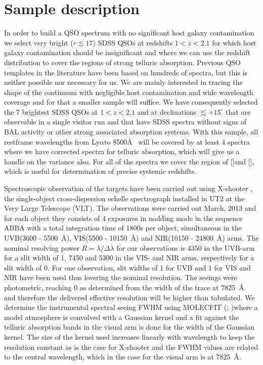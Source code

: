 \documentclass{aa}    %
\newcommand{\sectlabel}[1]{\label{sect:#1}}
\newcommand{\lya}{Ly$\alpha$}
\newcommand{\oii}{[\ion{O}{ii}]}
\newcommand{\oiii}{[\ion{O}{iii}]}
\begin{document}
\section{Sample description}   \sectlabel{sample}


In order to build a QSO spectrum with no significant host galaxy contamination we select very bright ($r \lesssim 17$) SDSS QSOs at redshifts $1 < z < 2.1$ for which host galaxy contamination should be insignificant and where we can use the redshift distribution to cover the regions of strong telluric absorption. Previous QSO templates in the literature have been based on hundreds of spectra, but this is neither possible nor necessary for us. We are mainly interested in tracing the shape of the continuum with negligible host contamination and wide wavelength coverage and for that a smaller sample will suffice. We have consequently selected the 7 brightest SDSS QSOs at $1 < z < 2.1$ and at declinations $\lesssim +15^\circ$ that are observable in a single visitor run and that have SDSS spectra without signs of BAL activity or other strong associated absorption systems. With this sample, all restframe wavelengths from \lya to 8500\AA~ will be covered by at least 4 spectra where we have corrected spectra for telluric absorption, which will give us a handle on the variance also. For all of the spectra we cover the region of \oii and \oiii, which is useful for determination of precise systemic redshifts.

Spectroscopic observation of the targets have been carried out using X-shooter \citep{Vernet2011}, the single-object cross-dispersion echelle spectrograph installed in UT2 at the Very Large Telescope (VLT). The observations were carried out March, 2013 and for each object they consists of 4 exposures in nodding mode in the sequence ABBA with a total integration time of 1800s per object, simultaneous in the UVB(3600 - 5500~\AA), VIS(5500 - 10150~\AA)  and NIR(10150 - 24800~\AA) arms. The nominal resolving power $R = \lambda / \Delta \lambda$ for our observations is 4350 in the UVB-arm for a slit width of 1, 7450 and 5300 in the VIS- and NIR arms, respectively for a slit width of 0. For one observation, slit widths of 1 for UVB and 1 for VIS and NIR have been used thus lovering the nominal resolution. The seeings were photometric, reaching 0 as determined from the width of the trace at 7825~\AA~ and therefore the delivered effective resolution will be higher than tabulated. We determine the instrumental spectral seeing FWHM using MOLECFIT (\cite{Smette2015}; \cite{Kausch2015})where a model atmosphere is convolved with a Gaussian kernel and a fit against the telluric absorption bands in the visual arm is done for the width of the Gaussian kernel. The size of the kernel used increases linearly with wavelength to keep the resolution constant as is the case for X-shooter and the FWHM values are related to the central wavelength, which in the case for the visual arm is at 7825~\AA. 
\end{document}
